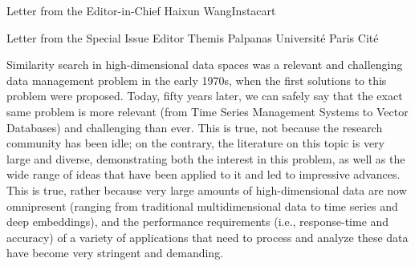 \documentclass[11pt]{article}
\begin{document}


\begin{bulletin}


%
%

\begin{lettersection}


\begin{letter}{Letter from the Editor-in-Chief}
 {Haixun Wang}{Instacart}
 
 \end{letter}

\newpage


\newpage

%
%
\begin{letter}{Letter from the Special Issue Editor} %
{Themis Palpanas}
{Universit{\'e} Paris Cit{\'e}}

Similarity search in high-dimensional data spaces was a relevant and challenging data management problem in the early 1970s, when the first solutions to this problem were proposed.
Today, fifty years later, we can safely say that the exact same problem is more relevant (from Time Series Management Systems to Vector Databases) and challenging than ever. 
This is true, not because the research community has been idle; on the contrary, the literature on this topic is very large and diverse, demonstrating both the interest in this problem, as well as the wide range of ideas that have been applied to it and led to impressive advances. 
This is true, rather because very large amounts of high-dimensional data are now omnipresent (ranging from traditional multidimensional data to time series and deep embeddings), and the performance requirements (i.e., response-time and accuracy) of a variety of applications that need to process and analyze these data have become very stringent and demanding.


\end{letter}
\end{lettersection}
\end{bulletin}
\end{document}
